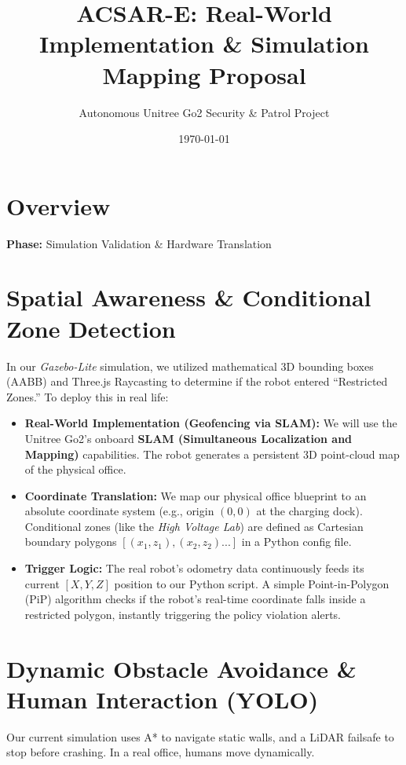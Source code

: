 \documentclass[12pt, a4paper]{article}
\title{\textbf{ACSAR-E: Real-World Implementation \& Simulation Mapping Proposal}}
\author{Autonomous Unitree Go2 Security \& Patrol Project}
\date{\today}
\begin{document}
\maketitle

\section*{Overview}
\textbf{Phase:} Simulation Validation \& Hardware Translation

\section{Spatial Awareness \& Conditional Zone Detection}
In our \textit{Gazebo-Lite} simulation, we utilized mathematical 3D bounding boxes (AABB) and Three.js Raycasting to determine if the robot entered ``Restricted Zones.'' To deploy this in real life:

\begin{itemize}
    \item \textbf{Real-World Implementation (Geofencing via SLAM):} We will use the Unitree Go2's onboard \textbf{SLAM (Simultaneous Localization and Mapping)} capabilities. The robot generates a persistent 3D point-cloud map of the physical office.
    \item \textbf{Coordinate Translation:} We map our physical office blueprint to an absolute coordinate system (e.g., origin $(0,0)$ at the charging dock). Conditional zones (like the \textit{High Voltage Lab}) are defined as Cartesian boundary polygons $[(x_1, z_1), (x_2, z_2)...]$ in a Python config file.
    \item \textbf{Trigger Logic:} The real robot's odometry data continuously feeds its current $[X, Y, Z]$ position to our Python script. A simple Point-in-Polygon (PiP) algorithm checks if the robot's real-time coordinate falls inside a restricted polygon, instantly triggering the policy violation alerts.
\end{itemize}

\section{Dynamic Obstacle Avoidance \& Human Interaction (YOLO)}
Our current simulation uses A* to navigate static walls, and a LiDAR failsafe to stop before crashing. In a real office, humans move dynamically.
\end{document}
